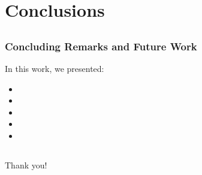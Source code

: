 \documentclass{beamer}
\begin{document}
\section{Conclusions}
\subsection{} 
\begin{frame}
\frametitle{Concluding Remarks and Future Work}
In this work, we presented:
\begin{itemize}
	\item 
	\item
	\item
	\item
	\item
\end{itemize}
\end{frame}
\subsection{} 
\begin{frame}
\Huge{\centerline{Thank you!}}
\end{frame}

\end{document}
